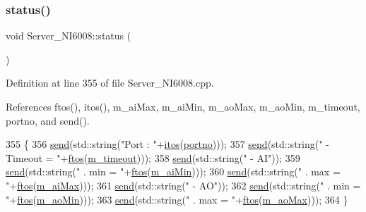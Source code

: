 \subsubsection{\texorpdfstring{status()}{status()}}
{\footnotesize\ttfamily void Server\+\_\+\+N\+I6008\+::status (\begin{DoxyParamCaption}{ }\end{DoxyParamCaption})}



Definition at line 355 of file Server\+\_\+\+N\+I6008.\+cpp.



References ftos(), itos(), m\+\_\+ai\+Max, m\+\_\+ai\+Min, m\+\_\+ao\+Max, m\+\_\+ao\+Min, m\+\_\+timeout, portno, and send().


\begin{DoxyCode}
355                            \{
356   \hyperlink{classServer__NI6008_af47694911afff2feb37a091d9fcab4fa}{send}(std::string(\textcolor{stringliteral}{"Port   : "}+\hyperlink{Tools_8h_af330027dbdafb9a30768b3613c553e60}{itos}(\hyperlink{classServer__NI6008_ae70c386215b3945d98eba610022db813}{portno})));
357   \hyperlink{classServer__NI6008_af47694911afff2feb37a091d9fcab4fa}{send}(std::string(\textcolor{stringliteral}{"   - Timeout = "}+\hyperlink{Tools_8h_ae78000c70889d75d67813c6cb83010a6}{ftos}(\hyperlink{classServer__NI6008_a782b89c4483096900a3c02f1b1fc2c2f}{m\_timeout})));
358   \hyperlink{classServer__NI6008_af47694911afff2feb37a091d9fcab4fa}{send}(std::string(\textcolor{stringliteral}{"   - AI"}));
359   \hyperlink{classServer__NI6008_af47694911afff2feb37a091d9fcab4fa}{send}(std::string(\textcolor{stringliteral}{"       . min = "}+\hyperlink{Tools_8h_ae78000c70889d75d67813c6cb83010a6}{ftos}(\hyperlink{classServer__NI6008_af0fea276566b46d56f235bece151af78}{m\_aiMin})));
360   \hyperlink{classServer__NI6008_af47694911afff2feb37a091d9fcab4fa}{send}(std::string(\textcolor{stringliteral}{"       . max = "}+\hyperlink{Tools_8h_ae78000c70889d75d67813c6cb83010a6}{ftos}(\hyperlink{classServer__NI6008_aa871878e7792bd5dc002f64ef7575dd4}{m\_aiMax})));
361   \hyperlink{classServer__NI6008_af47694911afff2feb37a091d9fcab4fa}{send}(std::string(\textcolor{stringliteral}{"   - AO"}));
362   \hyperlink{classServer__NI6008_af47694911afff2feb37a091d9fcab4fa}{send}(std::string(\textcolor{stringliteral}{"       . min = "}+\hyperlink{Tools_8h_ae78000c70889d75d67813c6cb83010a6}{ftos}(\hyperlink{classServer__NI6008_ad650503ceebacea17688e04065130eaa}{m\_aoMin})));  
363   \hyperlink{classServer__NI6008_af47694911afff2feb37a091d9fcab4fa}{send}(std::string(\textcolor{stringliteral}{"       . max = "}+\hyperlink{Tools_8h_ae78000c70889d75d67813c6cb83010a6}{ftos}(\hyperlink{classServer__NI6008_a228a5d51f43daaf9eaea8e77cfa3334e}{m\_aoMax})));
364 \}
\end{DoxyCode}


